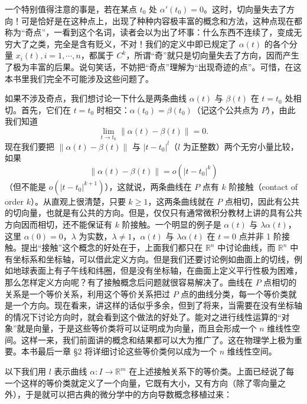 一个特别值得注意的事是，若在某点 $t_0$ 处 $\alpha'(t_0)=0$。这时，切向量失去了方向！可是恰好是在这种点上，出现了种种内容极丰富的概念和方法，这种点现在都称为“奇点”，一看到这个名词，读者会以为出了坏事：什么东西不连续了，变成无穷大了之类，完全是含有贬义，不对！我们的定义中即已规定了 $\alpha(t)$ 的各个分量 $x_i(t),i=1,\cdots,n$，都属于 $C^k$，所谓“奇”就只是切向量失去了方向，因而产生了极为丰富的后果。说句笑话，不妨把“奇点”理解为“出现奇迹的点”。可惜，在这本书里我们完全不可能涉及这些问题了。

如果不涉及奇点，我们想讨论一下什么是两条曲线 $\alpha(t)$ 与 $\beta(t)$ 在 $t=t_0$ 处相切。首先，它们在 $t=t_0$ 时相交：$\alpha(t_0)=\beta(t_0)$（记这个公共点为 $P$），由此我们知道
\[
 \lim_{t\to t_0}\lVert\alpha(t)-\beta(t)\rVert=0.
\]
现在我们要把 $\lVert\alpha(t)-\beta(t)\rVert$ 与 $|t-t_0|^l$（$l$ 为正整数）两个无穷小量比较，如果
\[
 \lVert\alpha(t)-\beta(t)\rVert=o(|t-t_0|^k)
\]
（但不能是 $o(|t-t_0|^{k+1})$），这就说，两条曲线在 $P$ 点有 $k$ 阶接触（contact of order $k$）。从直观上很清楚，只要 $k\ge1$，这两条曲线就在 $P$ 点相切，因此有公共的切向量，也就是有公共的方向。但是，仅仅只有通常微积分教材上讲的具有公共方向因而相切，还不能保证有 $k$ 阶接触。一个明显的例子是 $\alpha(t)$ 与 $\lambda\alpha(t)$，这里 $\alpha(0)=0$，$\lambda$ 为实数，$\lambda\ne1$，$\alpha(t)$ 与 $\lambda\alpha(t)$ 在 $t=0$ 点并非 1 阶接触。提出“接触”这个概念的好处在于，上面我们都只在 $\mathbb R^n$ 中讨论曲线，而 $\mathbb R^n$ 中有坐标系和坐标轴，可以借此定义方向。但是我们还要讨论例如曲面上的切线，例如地球表面上有子午线和纬圈，但是没有坐标轴，在曲面上定义平行性极为困难，那么怎样定义方向呢？有了接触概念后问题就很容易解决了。曲线在 $P$ 点相切的关系是一个等价关系，利用这个等价关系把过 $P$ 点的曲线分类，每一个等价类就是一个方向。现在看来，讲这样的话似乎多余，但到了将来，当需要在没有坐标轴的情况下讨论方向时，就会看到这个做法的好处了。能对之进行线性运算的“对象”就是向量，于是这些等价类将可以证明成为向量，而且会形成一个 $n$ 维线性空间。这样一来，我们前面讲的概念和结果都可以大为推广了。这在物理学上极为重要。本书最后一章 §2 将详细讨论这些等价类何以成为一个 $n$ 维线性空间。

以下我们用 $l$ 表示曲线 $\alpha:I\to\mathbb R^m$ 在上述接触关系下的等价类。上面已经说了每一个这样的等价类就定义了一个向量，它既有大小，又有方向（除了零向量之外），于是就可以把古典的微分学中的方向导数概念移植过来：

